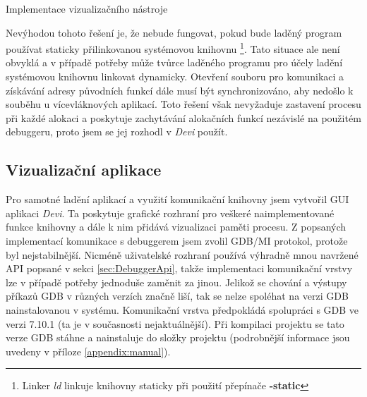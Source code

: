 \documentclass[bc,male,python,dept460]{diploma}						%
\newcommand{\parspace}[1][]{
	\ifthenelse{\isempty{#1}}{\vspace{5mm}}{\vspace{#1}}
	\par
}
\begin{document}
\begin{section}{Implementace vizualizačního nástroje}
\begin{description}
\begin{description}
				\parspace Nevýhodou tohoto řešení je, že nebude fungovat, pokud bude laděný program používat staticky přilinkovanou systémovou knihovnu
				\footnote{Linker \textit{ld} linkuje knihovny staticky při použití přepínače \textbf{-static}}.
				Tato situace ale není obvyklá a v případě potřeby může tvůrce laděného programu pro účely ladění systémovou knihovnu linkovat dynamicky.
				Otevření souboru pro komunikaci a získávání adresy původních funkcí dále musí být synchronizováno, aby nedošlo k souběhu u vícevláknových aplikací.
				Toto řešení však nevyžaduje zastavení procesu při každé alokaci a poskytuje zachytávání alokačních funkcí nezávislé na použitém debuggeru, proto
				jsem se jej rozhodl v \textit{Devi} použít.
				
			\end{description}
		\end{description}
			
	\subsection{Vizualizační aplikace}
	Pro samotné ladění aplikací a využití komunikační knihovny jsem vytvořil GUI aplikaci \textit{Devi}.
	Ta poskytuje grafické rozhraní pro veškeré naimplementované funkce knihovny a dále k nim přidává vizualizaci paměti procesu.
	Z popsaných implementací komunikace s debuggerem jsem zvolil GDB/MI protokol, protože byl nejstabilnější. Nicméně uživatelské rozhraní používá výhradně
	mnou navržené API popsané v sekci \ref{sec:DebuggerApi}, takže implementaci komunikační vrstvy lze v případě potřeby jednoduše zaměnit za jinou.
	Jelikož se chování a výstupy příkazů GDB v různých verzích značně liší, tak se nelze spoléhat na verzi GDB nainstalovanou v systému.
	Komunikační vrstva předpokládá spolupráci s GDB ve verzi 7.10.1 (ta je v současnosti nejaktuálnější). Při kompilaci projektu se tato verze GDB stáhne a
	nainstaluje do složky projektu (podrobnější informace jsou uvedeny v příloze \ref{appendix:manual}).
	
	

\end{section}
\end{document}
